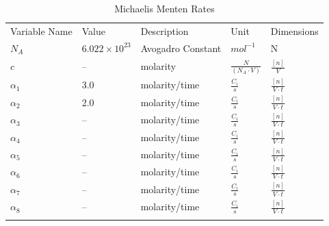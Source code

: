 \documentclass[smallextended]{svjour3}
\begin{document}
\begin{table}[h]
\caption{Michaelis Menten Rates}         
\label{tab:1}                                         
\begin{tabularx}{\textwidth}{XXXXX}      
\hline\noalign{\smallskip}
Variable Name & Value & Description & Unit & Dimensions \\
\noalign{\smallskip}\hline\noalign{\smallskip}
$N_A$      & $6.022 \times 10^23$ & Avogadro Constant     & $mol^{-1}$                      &N \\
$c$        & --                  & molarity               & $\frac{N}{(N_A \cdot V)}$       & $\frac{[n]}{V}$\\
$\alpha_1$ & 3.0                 & molarity/time          & $\frac{C_i}{s}$          & $\frac{[n]}{V \cdot t}$\\    
$\alpha_2$ & 2.0                 & molarity/time          & $\frac{C_i}{s}$          & $\frac{[n]}{V \cdot t}$ \\     
$\alpha_3$ & --                  & molarity/time          & $\frac{C_i}{s}$          & $\frac{[n]}{V \cdot t}$ \\
$\alpha_4$ & --                  & molarity/time          & $\frac{C_i}{s}$          & $\frac{[n]}{V \cdot t}$ \\
$\alpha_5$ & --                  & molarity/time          & $\frac{C_i}{s}$          & $\frac{[n]}{V \cdot t}$ \\
$\alpha_6$ & --                  & molarity/time          & $\frac{C_i}{s}$          & $\frac{[n]}{V \cdot t}$ \\
$\alpha_7$ & --                  & molarity/time          & $\frac{C_i}{s}$          & $\frac{[n]}{V \cdot t}$ \\
$\alpha_8$ & --                  & molarity/time          & $\frac{C_i}{s}$          & $\frac{[n]}{V \cdot t}$ \\
\noalign{\smallskip}\hline
\end{tabularx}
\end{table}
\end{document}
